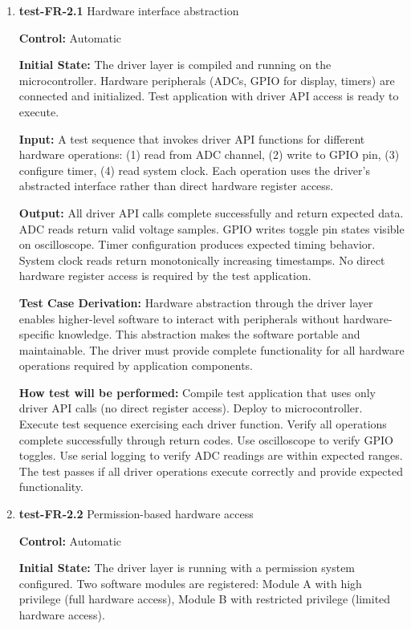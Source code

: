 \documentclass[12pt, titlepage]{article}
\begin{document}
\begin{enumerate}

\item{\textbf{test-FR-2.1} Hardware interface abstraction \\}

\textbf{Control:} Automatic
					
\textbf{Initial State:} 
The driver layer is compiled and running on the microcontroller. Hardware 
peripherals (ADCs, GPIO for display, timers) are connected and initialized. 
Test application with driver API access is ready to execute.
					
\textbf{Input:}
A test sequence that invokes driver API functions for different hardware 
operations: (1) read from ADC channel, (2) write to GPIO pin, (3) configure 
timer, (4) read system clock. Each operation uses the driver's abstracted 
interface rather than direct hardware register access.
					
\textbf{Output:}
All driver API calls complete successfully and return expected data. ADC reads 
return valid voltage samples. GPIO writes toggle pin states visible on 
oscilloscope. Timer configuration produces expected timing behavior. System 
clock reads return monotonically increasing timestamps. No direct hardware 
register access is required by the test application.

\textbf{Test Case Derivation:} 
Hardware abstraction through the driver layer enables higher-level software 
to interact with peripherals without hardware-specific knowledge. This abstraction 
makes the software portable and maintainable. The driver must provide complete 
functionality for all hardware operations required by application components.
					
\textbf{How test will be performed:}
Compile test application that uses only driver API calls (no direct register 
access). Deploy to microcontroller. Execute test sequence exercising each driver 
function. Verify all operations complete successfully through return codes. 
Use oscilloscope to verify GPIO toggles. Use serial logging to verify ADC 
readings are within expected ranges. The test passes if all driver operations 
execute correctly and provide expected functionality.

\item{\textbf{test-FR-2.2} Permission-based hardware access\\}

\textbf{Control:} Automatic
					
\textbf{Initial State:} 
The driver layer is running with a permission system configured. Two software 
modules are registered: Module A with high privilege (full hardware access), 
Module B with restricted privilege (limited hardware access).
					

\end{enumerate}
\end{document}
